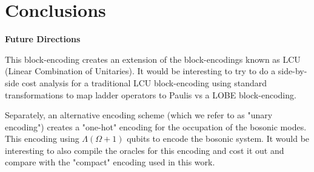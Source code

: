 \section{Conclusions}
\label{sec:conclusions}

\textbf{Future Directions}

This block-encoding creates an extension of the block-encodings known as LCU (Linear Combination of Unitaries).
It would be interesting to try to do a side-by-side cost analysis for a traditional LCU block-encoding using standard transformations to map ladder operators to Paulis vs a LOBE block-encoding.

Separately, an alternative encoding scheme (which we refer to as "unary encoding") creates a "one-hot" encoding for the occupation of the bosonic modes.
This encoding using $\Lambda (\Omega + 1)$ qubits to encode the bosonic system.
It would be interesting to also compile the oracles for this encoding and cost it out and compare with the "compact" encoding used in this work.
  
